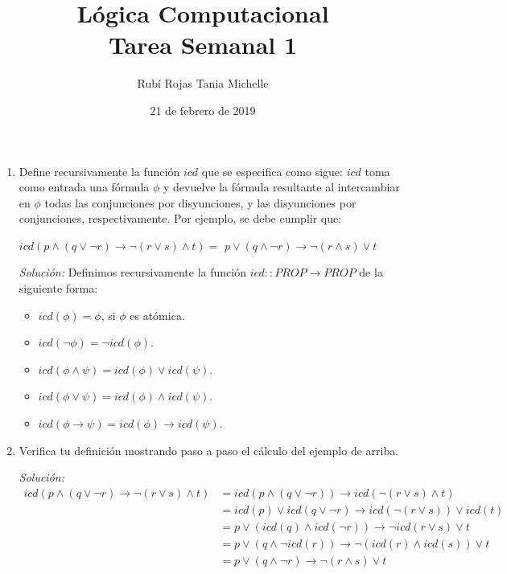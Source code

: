 \documentclass[letterpaper,12pt]{article}
\title{Lógica Computacional \\ Tarea Semanal 1}
\author{Rubí Rojas Tania Michelle}
\date{21 de febrero de 2019}
\begin{document}
\maketitle

\begin{enumerate}
    
    \item Define recursivamente la función $icd$ que se especifica como sigue:
    $icd$ toma como entrada una fórmula $\phi$ y devuelve la fórmula resultante
    al intercambiar en $\phi$ todas las conjunciones por disyunciones, y las 
    disyunciones por conjunciones, respectivamente. Por ejemplo, se debe 
    cumplir que:
    \begin{center}
        $icd (p \land (q \lor \neg r) \rightarrow \neg (r \lor s) \land t) = $
        $p \lor (q \land \neg r) \rightarrow \neg (r \land s) \lor t$
    \end{center}

    \textit{Solución:} Definimos recursivamente la función 
    $icd :: PROP \rightarrow PROP$ de la siguiente forma:
    \begin{itemize}
        \item $icd (\phi) = \phi$,  si $\phi$ es atómica. 
        \item $icd (\neg \phi) = \neg icd(\phi)$. 
        \item $icd (\phi \land \psi) = icd(\phi) \lor icd(\psi)$. 
        \item $icd (\phi \lor \psi) = icd(\phi) \land icd(\psi)$. 
        \item $icd (\phi \rightarrow \psi) = icd(\phi) \rightarrow icd(\psi)$. 
    \end{itemize}

    \item Verifica tu definición mostrando paso a paso el cálculo del ejemplo 
    de arriba.

    \textit{Solución: }
    \begin{align*}
        icd(p \land (q \lor \neg r) \rightarrow \neg (r \lor s) \land t)
        &= icd(p \land (q\lor\neg r)) \rightarrow icd(\neg (r\lor s) \land t)\\
        &= icd(p) \lor icd(q\lor\neg r) \rightarrow icd( \neg(r\lor s)) \lor icd(t)\\
        &= p \lor (icd(q) \land icd(\neg r)) \rightarrow \neg icd(r \lor s) \lor t\\
        &= p \lor (q \land \neg icd(r)) \rightarrow \neg (icd(r) \land icd(s)) \lor t\\
        &= p \lor (q  \land \neg r) \rightarrow \neg (r \land s) \lor t
    \end{align*}


\end{enumerate}
\end{document}
